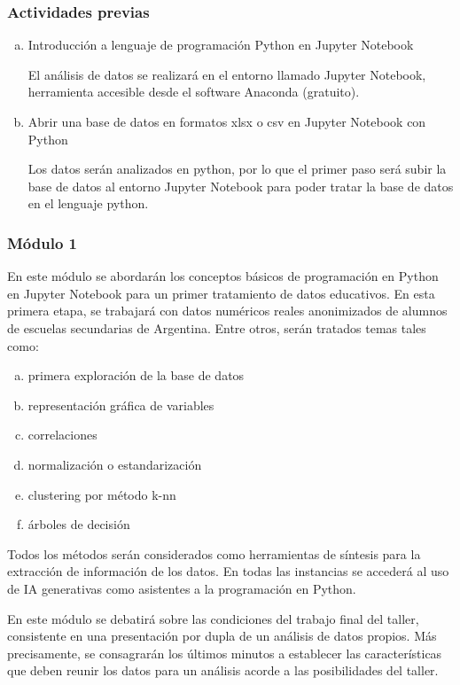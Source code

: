 \subsubsection{Actividades previas}

\begin{enumerate}[a)]
	\item Introducción a lenguaje de programación Python en Jupyter	Notebook
	
	El análisis de datos se realizará en el entorno llamado Jupyter Notebook, herramienta accesible desde el software Anaconda (gratuito).
	
	\item Abrir una base de datos en formatos xlsx o csv en Jupyter	Notebook con Python
	
	Los datos serán analizados en python, por lo que el primer paso será subir la base de datos al entorno Jupyter Notebook para poder tratar la base de datos	en el lenguaje python.
\end{enumerate}

\subsubsection{Módulo 1}

En este módulo se abordarán los conceptos básicos de programación en Python en Jupyter Notebook para un primer tratamiento de datos educativos. En esta primera etapa, se trabajará con datos numéricos reales anonimizados de alumnos de escuelas secundarias de Argentina. Entre otros, serán tratados temas tales como:

\begin{enumerate}[a)]
	\item primera exploración de la base de datos
	\item representación gráfica de variables
	\item correlaciones
	\item normalización o estandarización
	\item clustering por método k-nn
	\item árboles de decisión
\end{enumerate}

Todos los métodos serán considerados como herramientas de síntesis para la extracción de información de los datos. En todas las instancias se accederá al uso de IA generativas como asistentes a la programación en Python.

En este módulo se debatirá sobre las condiciones del trabajo final del taller, consistente en una presentación por dupla de un análisis de datos propios. Más precisamente, se consagrarán los últimos minutos a establecer las características que deben reunir los datos para un análisis acorde a las posibilidades del taller.


